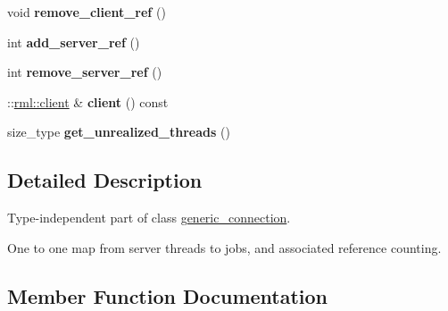 \begin{DoxyCompactItemize}
\item 
\hypertarget{classrml_1_1internal_1_1thread__map_a5f92061bc2464e9b3dab697972dddba1}{}void {\bfseries remove\+\_\+client\+\_\+ref} ()\label{classrml_1_1internal_1_1thread__map_a5f92061bc2464e9b3dab697972dddba1}

\item 
\hypertarget{classrml_1_1internal_1_1thread__map_a99112292877f23570e53617cb0543aa8}{}int {\bfseries add\+\_\+server\+\_\+ref} ()\label{classrml_1_1internal_1_1thread__map_a99112292877f23570e53617cb0543aa8}

\item 
\hypertarget{classrml_1_1internal_1_1thread__map_ac3dd9c36c704da62827bb718106000eb}{}int {\bfseries remove\+\_\+server\+\_\+ref} ()\label{classrml_1_1internal_1_1thread__map_ac3dd9c36c704da62827bb718106000eb}

\item 
\hypertarget{classrml_1_1internal_1_1thread__map_a48e93bfa16bb3992f18952cb47fedaf7}{}\+::\hyperlink{classrml_1_1client}{rml\+::client} \& {\bfseries client} () const \label{classrml_1_1internal_1_1thread__map_a48e93bfa16bb3992f18952cb47fedaf7}

\item 
\hypertarget{classrml_1_1internal_1_1thread__map_a851871965536c60c123bf1b5c2535e23}{}size\+\_\+type {\bfseries get\+\_\+unrealized\+\_\+threads} ()\label{classrml_1_1internal_1_1thread__map_a851871965536c60c123bf1b5c2535e23}

\end{DoxyCompactItemize}


\subsection{Detailed Description}
Type-\/independent part of class \hyperlink{classrml_1_1internal_1_1generic__connection}{generic\+\_\+connection}. 

One to one map from server threads to jobs, and associated reference counting. 

\subsection{Member Function Documentation}
\hypertarget{classrml_1_1internal_1_1thread__map_aa3487b9b383ff6b2c16324377e73ef41}{}
